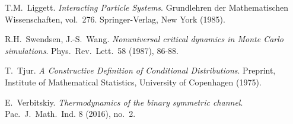 \documentclass[12pt]{article}
\newcommand{\1}{\mathbbm{1}}
\newcommand{\5}{\vspace{0.5cm}}
\theoremstyle{definition}
\begin{document}
\begin{thebibliography}{++}
 T.M.~Liggett. \textit{Interacting Particle Systems}. Grundlehren der Mathematischen Wissenschaften, vol.~276. Springer-Verlag, New York (1985).

 R.H.~Swendsen, J.-S.~Wang. \textit{Nonuniversal critical dynamics in Monte Carlo simulations}. Phys.~Rev.~Lett.~58 (1987), 86-88.

 T.~Tjur. \textit{A Constructive Definition of Conditional Distributions}. Preprint, Institute of Mathematical Statistics, University of Copenhagen (1975).

 E.~Verbitskiy. \textit{Thermodynamics of the binary symmetric channel}. Pac.~J.~Math.~Ind. 8 (2016), no.~2.

\end{thebibliography}

\end{document}
